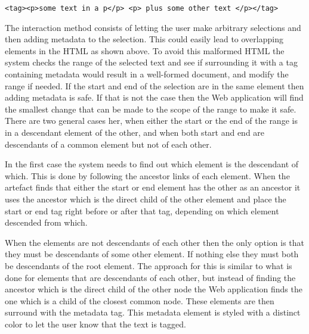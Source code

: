 \texttt{<tag><p>some text in a p</p> <p> plus some other text </p></tag>}

The interaction method consists of letting the user make arbitrary selections and then adding metadata to the selection.
This could easily lead to overlapping elements in the HTML as shown above.
To avoid this malformed HTML the system checks the range of the selected text and see if surrounding it with a tag
containing metadata would result in a well-formed document, and modify the range if needed.
If the start and end of the selection are in the same element then adding metadata is safe.
If that is not the case then the Web application will find the smallest change that can be made to the scope of the range to make it safe.
There are two general cases her, when either the start or the end of the range is in a descendant element of the other,
and when both start and end are descendants of a common element but not of each other.

In the first case the system needs to find out which element is the descendant of which.
This is done by following the ancestor links of each element.
When the artefact finds that either the start or end element has the other as an ancestor it uses the ancestor which is the direct
child of the other element and place the start or end tag right before or after that tag, depending on which element
descended from which.

When the elements are not descendants of each other then the only option is that they must be descendants of some other element.
If nothing else they must both be descendants of the root element.
The approach for this is similar to what is done for elements that are descendants of each other,
but instead of finding the ancestor which is the direct child of the other node the Web application finds the one which is a child of the
closest common node.
These elements are then surround with the metadata tag.
This metadata element is styled with a distinct color to let the user know that the text is tagged.

